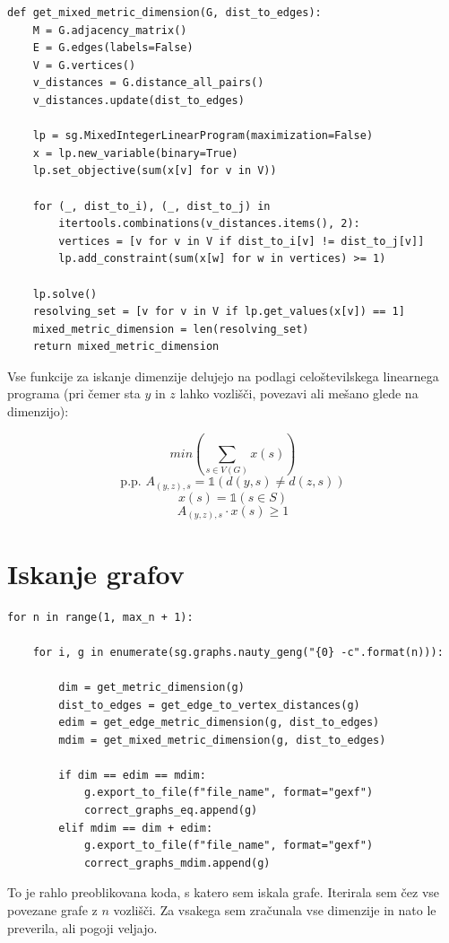 \documentclass[a4paper,12pt]{article}
\theoremstyle{definition}
\theoremstyle{remark}
\theoremstyle{definition}
\begin{document}
\begin{lstlisting}
def get_mixed_metric_dimension(G, dist_to_edges):
    M = G.adjacency_matrix()
    E = G.edges(labels=False)
    V = G.vertices()
    v_distances = G.distance_all_pairs()
    v_distances.update(dist_to_edges)

    lp = sg.MixedIntegerLinearProgram(maximization=False)
    x = lp.new_variable(binary=True)
    lp.set_objective(sum(x[v] for v in V))

    for (_, dist_to_i), (_, dist_to_j) in
        itertools.combinations(v_distances.items(), 2):
        vertices = [v for v in V if dist_to_i[v] != dist_to_j[v]]
        lp.add_constraint(sum(x[w] for w in vertices) >= 1)

    lp.solve()
    resolving_set = [v for v in V if lp.get_values(x[v]) == 1]
    mixed_metric_dimension = len(resolving_set)
    return mixed_metric_dimension
\end{lstlisting}

Vse funkcije za iskanje dimenzije delujejo na podlagi celoštevilskega
linearnega programa (pri čemer sta $y$ in $z$ lahko vozlišči, povezavi ali mešano
glede na dimenzijo):

$$ min(\sum_{s\in V(G)}x(s)) $$
$$ \text{p.p. }
    A_{(y, z), s} = \mathds{1}(d(y, s) \neq d(z, s)) $$
$$   x(s) = \mathds{1}(s \in S) $$
$$   A_{(y, z), s} \cdot x(s) \geq 1 $$

\section*{Iskanje grafov}

\begin{lstlisting}
for n in range(1, max_n + 1):

    for i, g in enumerate(sg.graphs.nauty_geng("{0} -c".format(n))):

        dim = get_metric_dimension(g)
        dist_to_edges = get_edge_to_vertex_distances(g)
        edim = get_edge_metric_dimension(g, dist_to_edges)
        mdim = get_mixed_metric_dimension(g, dist_to_edges)

        if dim == edim == mdim:
            g.export_to_file(f"file_name", format="gexf")
            correct_graphs_eq.append(g)
        elif mdim == dim + edim:
            g.export_to_file(f"file_name", format="gexf")
            correct_graphs_mdim.append(g)
\end{lstlisting}

To je rahlo preoblikovana koda, s katero sem iskala grafe. Iterirala sem čez
vse povezane grafe z $n$ vozlišči. Za vsakega sem zračunala vse dimenzije in
nato le preverila, ali pogoji veljajo.
\end{document}

